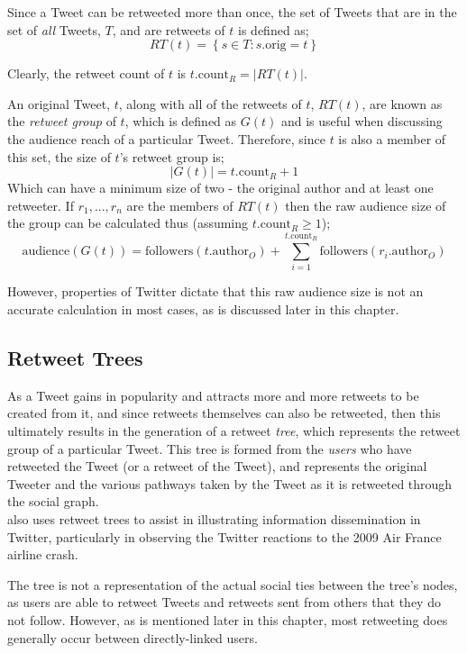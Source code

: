 Since a Tweet can be retweeted more than once, the set of Tweets that are in the set of \textit{all} Tweets, $T$, and are retweets of $t$ is defined as;
\[
	RT(t) = \left\{ s \in T : s.\textrm{orig} = t \right\}
\]

Clearly, the retweet count of $t$ is $ t.\mathrm{count}_R = \left\vert{RT(t)}\right\vert $.

An original Tweet, $t$, along with all of the retweets of $t$, $RT(t)$, are known as the \textit{retweet group} of $t$, which is defined as $G(t)$ and is useful when discussing the audience reach of a particular Tweet. Therefore, since $t$ is also a member of this set, the size of $t$'s retweet group is; 
\[
	\left\vert{G(t)}\right\vert = t.\mathrm{count}_R + 1 
\] 
Which can have a minimum size of two - the original author and at least one retweeter. If $ r_1,...,r_n $ are the members of $RT(t)$ then the raw audience size of the group can be calculated thus (assuming $t.\textrm{count}_R \geq 1$);
\[
	\textrm{audience}(G(t)) = \textrm{followers}(t.\textrm{author}_O) + \sum\limits_{i=1}^{t.\mathrm{count}_R} \textrm{followers}(r_i.\textrm{author}_O)
\]

However, properties of Twitter dictate that this raw audience size is not an accurate calculation in most cases, as is discussed later in this chapter.


\subsection{Retweet Trees}
As a Tweet gains in popularity and attracts more and more retweets to be created from it, and since retweets themselves can also be retweeted, then this ultimately results in the generation of a retweet \textit{tree}, which represents the retweet group of a particular Tweet. This tree is formed from the \textit{users} who have retweeted the Tweet (or a retweet of the Tweet), and represents the original Tweeter and the various pathways taken by the Tweet as it is retweeted through the social graph.\\
\cite{kwak10} also uses retweet trees to assist in illustrating information dissemination in Twitter, particularly in observing the Twitter reactions to the 2009 Air France airline crash.

The tree is not a representation of the actual social ties between the tree's nodes, as users are able to retweet Tweets and retweets sent from others that they do not follow. However, as is mentioned later in this chapter, most retweeting does generally occur between directly-linked users.

